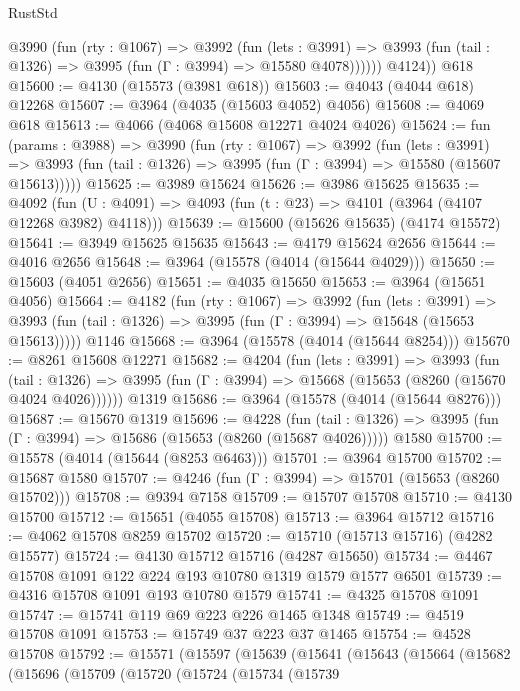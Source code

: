 \begin{lexlean}{RustStd}
\begin{coremodule}
          @3990
            (fun (rty : @1067) =>
            @3992
              (fun (lets : @3991) =>
              @3993 (fun (tail : @1326) => @3995 (fun (Γ : @3994) => @15580 @4078))))))
        @4124))
    @618
@15600 := @4130 (@15573 (@3981 @618))
@15603 := @4043 (@4044 @618) @12268
@15607 := @3964 (@4035 (@15603 @4052) @4056)
@15608 := @4069 @618
@15613 := @4066 (@4068 @15608 @12271 @4024 @4026)
@15624 := fun (params : @3988) =>
  @3990
    (fun (rty : @1067) =>
    @3992
      (fun (lets : @3991) =>
      @3993 (fun (tail : @1326) => @3995 (fun (Γ : @3994) => @15580 (@15607 @15613)))))
@15625 := @3989 @15624
@15626 := @3986 @15625
@15635 := @4092
    (fun (U : @4091) => @4093 (fun (t : @23) => @4101 (@3964 (@4107 @12268 @3982) @4118)))
@15639 := @15600 (@15626 @15635) (@4174 @15572)
@15641 := @3949 @15625 @15635
@15643 := @4179 @15624 @2656
@15644 := @4016 @2656
@15648 := @3964 (@15578 (@4014 (@15644 @4029)))
@15650 := @15603 (@4051 @2656)
@15651 := @4035 @15650
@15653 := @3964 (@15651 @4056)
@15664 := @4182
    (fun (rty : @1067) =>
    @3992
      (fun (lets : @3991) =>
      @3993 (fun (tail : @1326) => @3995 (fun (Γ : @3994) => @15648 (@15653 @15613)))))
    @1146
@15668 := @3964 (@15578 (@4014 (@15644 @8254)))
@15670 := @8261 @15608 @12271
@15682 := @4204
    (fun (lets : @3991) =>
    @3993
      (fun (tail : @1326) =>
      @3995 (fun (Γ : @3994) => @15668 (@15653 (@8260 (@15670 @4024 @4026))))))
    @1319
@15686 := @3964 (@15578 (@4014 (@15644 @8276)))
@15687 := @15670 @1319
@15696 := @4228
    (fun (tail : @1326) => @3995 (fun (Γ : @3994) => @15686 (@15653 (@8260 (@15687 @4026)))))
    @1580
@15700 := @15578 (@4014 (@15644 (@8253 @6463)))
@15701 := @3964 @15700
@15702 := @15687 @1580
@15707 := @4246 (fun (Γ : @3994) => @15701 (@15653 (@8260 @15702)))
@15708 := @9394 @7158
@15709 := @15707 @15708
@15710 := @4130 @15700
@15712 := @15651 (@4055 @15708)
@15713 := @3964 @15712
@15716 := @4062 @15708 @8259 @15702
@15720 := @15710 (@15713 @15716) (@4282 @15577)
@15724 := @4130 @15712 @15716 (@4287 @15650)
@15734 := @4467 @15708 @1091 @122 @224 @193 @10780 @1319 @1579 @1577 @6501
@15739 := @4316 @15708 @1091 @193 @10780 @1579
@15741 := @4325 @15708 @1091
@15747 := @15741 @119 @69 @223 @226 @1465 @1348
@15749 := @4519 @15708 @1091
@15753 := @15749 @37 @223 @37 @1465
@15754 := @4528 @15708
@15792 := @15571
    (@15597
      (@15639
        (@15641
          (@15643
            (@15664
              (@15682
                (@15696
                  (@15709
                    (@15720
                      (@15724
                        (@15734
                          (@15739

\end{coremodule}
\end{lexlean}
